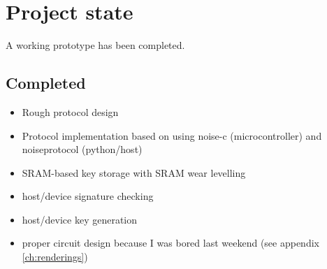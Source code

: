 \documentclass[12pt,a4paper,notitlepage]{article}
\begin{document}

\nocite{*}
\printbibliography

\appendix
\section{Project state}
A working prototype has been completed.

\subsection{Completed}
\begin{itemize}
    \item Rough protocol design
    \item Protocol implementation based on \textcite{perrin01} using noise-c (microcontroller) and noiseprotocol (python/host)
    \item SRAM-based key storage with SRAM wear levelling
    \item host/device signature checking
    \item host/device key generation
    \item proper circuit design because I was bored last weekend (see appendix \ref{ch:renderings})
\end{itemize}
\end{document}
